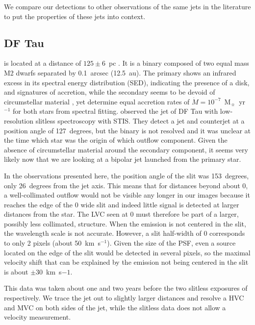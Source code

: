 \documentclass[twocolumn]{aastex62}
\begin{document}
We compare our detections to other observations of the same jets in the literature to put the properties of these jets into context.

\subsection{DF Tau}

 is located at a distance of $125\pm6$~pc
\citep{2016A&A...595A...1G,2018A&A...616A...1G}. It is a binary composed of two
equal mass M2 dwarfs separated by 0.1~arcsec (12.5~au). The primary shows an
infrared excess in its spectral energy distribution (SED), indicating the
presence of a disk, and signatures of accretion, while the secondary seems to
be devoid of circumstellar material \citep{2017ApJ...845..161A}, yet
\citet{2003ApJ...583..334H} determine equal accretion rates of $\dot M=10^{-7}$~M$_{\sun}$~yr$^{-1}$ for both stars from spectral fitting.
\citet{2004ApJ...609..261H} observed the jet of DF Tau with low-resolution slitless spectroscopy with STIS. They detect a jet and counterjet at a
position angle of 127~degrees, but the binary is not resolved and it was unclear at the time which star was the origin of which outflow component. Given the absence of circumstellar material around the secondary component, it seems very likely now that we are looking at a bipolar jet launched from the primary star. 

In the observations presented here, the position angle of the slit was 153~degrees, only 26~degrees from the jet axis. This means that for distances beyond about 0, a well-collimated outflow would not be visible any longer in our images because it reaches the edge of the 0 wide slit and indeed little signal is detected at larger distances from the star. The LVC seen at 0 must therefore be part of a larger, possibly less collimated, structure. When the emission is not centered in the slit, the wavelength scale is not accurate. However, a slit half-width of 0 corresponds to only 2 pixels (about 50~km~s$^{-1}$). Given the size of the PSF, even a source located on the edge of the slit would be detected in several pixels, so the maximal velocity shift that can be explained by the emission not being centered in the slit is about $\pm30$~km~s${-1}$.

This data was taken about one and two years before the two slitless exposures of \citet{2004ApJ...609..261H} respectively. We trace the jet out to slightly larger distances and resolve a HVC and MVC on both sides of the jet, while the slitless data does not allow a velocity measurement.
\end{document}
